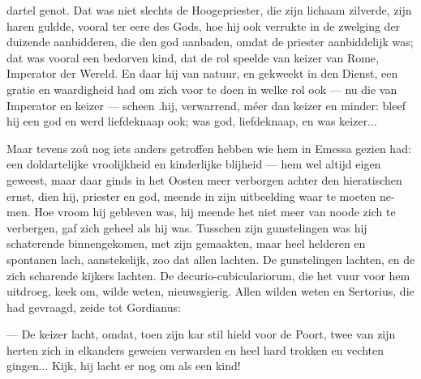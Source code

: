 \documentclass[a4paper, 12pt, oneside, dutch]{article}
\begin{document}
dartel genot. Dat was niet slechts de Hoogepriester, die zijn lichaam zilverde, zijn haren guldde, vooral ter eere des Gods, hoe hij ook verrukte in de zwelging der duizende aanbidderen, die den god aanbaden, omdat de priester aanbiddelijk was; dat was vooral een bedorven kind, dat de rol speelde van keizer van Rome, Imperator der Wereld. En daar hij van natuur, en gekweekt in den Dienst, een gratie en waardigheid had om zich voor te doen in welke rol ook --- nu die van Imperator en keizer --- scheen .hij, verwarrend, méer dan keizer en minder: bleef hij een god en werd liefdeknaap ook; was god, liefdeknaap, en was keizer...

Maar tevens zoû nog iets anders getroffen hebben wie hem in Emessa gezien had: een doldartelijke vroolijkheid en kinderlijke blijheid --- hem wel altijd eigen geweest, maar daar ginds in het Oosten meer verborgen achter den hieratischen ernst, dien hij, priester en god, meende in zijn uitbeelding waar te moeten ne-men. Hoe vroom hij gebleven was, hij meende het niet meer van noode zich te verbergen, gaf zich geheel als hij was. Tusschen zijn gunstelingen was hij schaterende binnengekomen, met zijn gemaakten, maar heel helderen en spontanen lach, aanstekelijk, zoo dat allen lachten. De gunstelingen lachten, en de zich scharende kijkers lachten. De decurio-cubiculariorum, die het vuur voor hem uitdroeg, keek om, wilde weten, nieuwsgierig. Allen wilden weten en Sertorius, die had gevraagd, zeide tot Gordianus:

--- De keizer lacht, omdat, toen zijn kar stil hield voor de Poort, twee van zijn herten zich in elkanders geweien verwarden en heel hard trokken en vechten gingen... Kijk, hij lacht er nog om als een kind!
\end{document}
